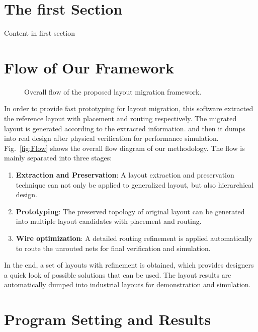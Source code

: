 
\section{The first Section}

  Content in first section \cite{Chin_DMR_ICCAD2013}

   

\section{Flow of Our Framework}
  \begin{figure}[ht]
    \centering
    \centerline{}
    \caption{Overall flow of the proposed layout migration framework.} 
    \centering{\label{fig:Flow}}
  \end{figure}


  In order to provide fast prototyping for layout migration, this software extracted the reference layout with placement and routing respectively. The migrated layout is generated according to the extracted information. and then it dumps into real design after physical verification for performance simulation. Fig.~\ref{fig:Flow} shows the overall flow diagram of our methodology.
  The flow is mainly separated into three stages: 
  \begin{enumerate}
    \item {\bf Extraction and Preservation}: A layout extraction and preservation technique \cite{Chin_DMR_ICCAD2013} can not only be applied to generalized layout, but also hierarchical design.
    \item {\bf Prototyping}: The preserved topology of original layout can be generated into multiple layout candidates with placement and routing. 
    \item {\bf Wire optimization}: A detailed routing refinement is applied automatically to route the unrouted nets for final verification and simulation.
  \end{enumerate}

  In the end, a set of layouts with refinement is obtained, which provides designers a quick look of possible solutions that can be used. The layout results are automatically dumped into industrial layouts for demonstration and simulation. 


\section{Program Setting and Results}
  
